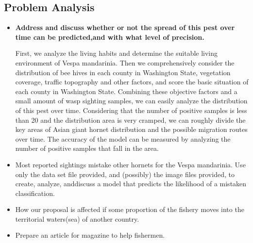 \documentclass{mcmthesis}
\numberwithin{figure}{section}
\numberwithin{table}{section}
\begin{document}
\subsection{Problem Analysis}









\begin{itemize}
  \item \textbf{Address and discuss whether or not the spread of this pest over time can be predicted,and with what level of precision.}
  
  First, we analyze the living habits and determine the suitable living environment of Vespa mandarinia. Then we comprehensively consider the distribution of bee hives in each county in Washington State, vegetation coverage, traffic topography and other factors, and score the basic situation of each county in Washington State. Combining these objective factors and a small amount of wasp sighting samples, we can easily analyze the distribution of this pest over time. Considering that the number of positive samples is less than 20 and the distribution area is very cramped, we can roughly divide the key areas of Asian giant hornet distribution and the possible migration routes over time. The accuracy of the model can be measured by analyzing the number of positive samples that fall in the area.
  \item Most reported sightings mistake other hornets for the Vespa mandarinia. Use only the data set file provided, and (possibly) the image files provided, to create, analyze, anddiscuss a model that predicts the likelihood of a mistaken classification.
 \item How our proposal is affected if some proportion of the fishery moves into the territorial waters(sea) of another country.
 \item Prepare an article for magazine to help fishermen.
\end{itemize}
\end{document}
